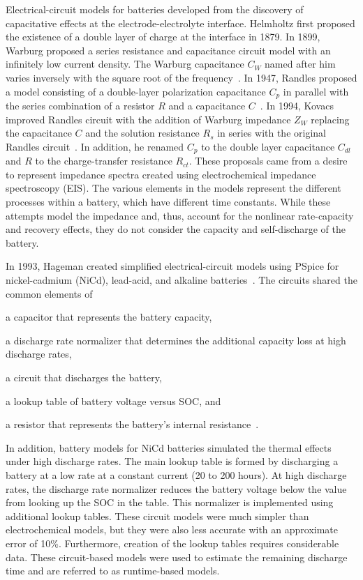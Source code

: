 \documentclass[../zhang_thesis.tex]{subfiles}
\begin{document}
Electrical-circuit models for batteries developed from the discovery of capacitative effects at the electrode-electrolyte interface. Helmholtz first proposed the existence of a double layer of charge at the interface in 1879. In 1899, Warburg proposed a series resistance and capacitance circuit model with an infinitely low current density. The Warburg capacitance $C_W$ named after him varies inversely with the square root of the frequency~\cite{geddes97}. In 1947, Randles proposed a model
consisting of a double-layer polarization capacitance $C_p$ in parallel with the series combination of a resistor $R$ and a capacitance $C$~\cite{randles47}. In 1994, Kovacs improved Randles circuit with the addition of Warburg impedance $Z_W$ replacing the capacitance $C$ and the solution resistance $R_s$ in series with the original Randles circuit~\cite{kovacs95}. In addition, he renamed $C_p$ to the double layer capacitance $C_{dl}$ and $R$ to the charge-transfer resistance
$R_{ct}$. These proposals came from a desire to represent impedance spectra created using electrochemical impedance spectroscopy (EIS). The various elements in the models represent the different processes within a battery, which have different time constants. While these attempts model the impedance and, thus, account for the nonlinear rate-capacity and recovery effects, they do not consider the capacity and self-discharge of the battery.

In 1993, Hageman created simplified electrical-circuit models using PSpice for nickel-cadmium (NiCd), lead-acid, and alkaline batteries~\cite{hageman93}. The circuits shared the common elements of
\begin{enumerate*}[label=\emph{\roman*})]
\item a capacitor that represents the battery capacity,
\item a discharge rate normalizer that determines the additional capacity loss at high discharge rates,
\item a circuit that discharges the battery,
\item a lookup table of battery voltage versus SOC, and
\item a resistor that represents the battery's internal resistance~\cite{hageman93,hageman97}.
\end{enumerate*}
In addition, battery models for NiCd batteries simulated the thermal effects under high discharge rates. The main lookup table is formed by discharging a battery at a low rate at a constant current (20 to 200 hours). At high discharge rates, the discharge rate normalizer reduces the battery voltage below the value from looking up the SOC in the table. This normalizer is implemented using additional lookup tables. These circuit models were much simpler than electrochemical models, but they
were also less accurate with an approximate error of 10\%. Furthermore, creation of the lookup tables requires considerable data. These circuit-based models were used to estimate the remaining discharge time and are referred to as runtime-based models.
\end{document}
